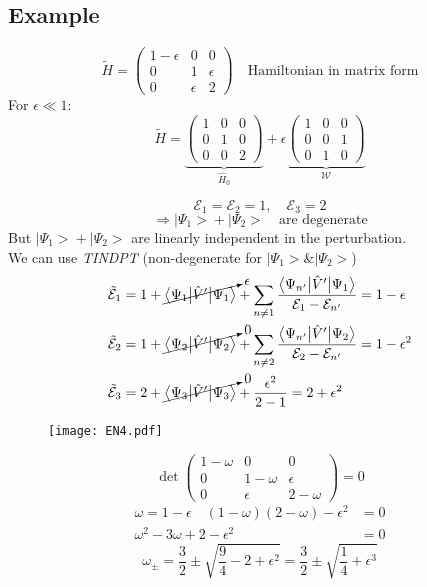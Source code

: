\documentclass[12pt,fancychapters]{report}
\numberwithin{equation}{section}
\begin{document}
\subsection*{Example}
\[
  \tilde{H} = 
  \begin{pmatrix}
  1-\epsilon & 0 & 0\\
  0 & 1 & \epsilon\\
  0 & \epsilon & 2
\end{pmatrix}\quad \text{Hamiltonian in matrix form}
\]
For $\epsilon \ll 1$:
\[
  \tilde{H} = 
  \underbrace{\begin{pmatrix}
  1 & 0 & 0\\
  0 & 1 & 0\\
  0 & 0 & 2
\end{pmatrix}}_{\hat{H}_0} + \epsilon 
  \underbrace{\begin{pmatrix}
  1 & 0 & 0\\
  0 & 0 & 1\\
  0 & 1 & 0
\end{pmatrix}}_{\mathcal{W}}
\]

\[
  \mathcal{E}_1 = \mathcal{E}_2 = 1, \quad \mathcal{E}_3 = 2
\]
\[
  \Rightarrow \big|\Psi_1\big> + \big|\Psi_2\big> \quad \text{are degenerate}
\]
But $ \big|\Psi_1\big> + \big|\Psi_2\big> $ are linearly independent in the perturbation.\\
We can use \emph{TINDPT} (non-degenerate for $\big|\Psi_1\big> \& \big|\Psi_2\big>$)
\begin{align*}
  \tilde{\mathcal{E}}_1 &= 1 + 
  \cancelto{\epsilon}{\big<\Psi_1\big|\hat{V}'\big|\Psi_1 \big>} + \sum_{n\neq 1}
  \frac{\big<\Psi_{n'}\big|\hat{V}'\big|\Psi_1 \big>}{\mathcal{E}_1 - 
  \mathcal{E}_{n'}} = 1-\epsilon\\
  \tilde{\mathcal{E}}_2 &= 1 + \cancelto{0}{\big<\Psi_2\big|\hat{V}'\big|\Psi_2 \big>} + \sum_{n\neq 2}
  \frac{\big<\Psi_{n'}\big|\hat{V}'\big|\Psi_2 \big>}{\mathcal{E}_2 - 
  \mathcal{E}_{n'}} = 1-\epsilon^2\\
  \tilde{\mathcal{E}}_3 &= 2 +\cancelto{0}{\big<\Psi_3\big|\hat{V}'\big|\Psi_3 \big>} +
  \frac{\epsilon^2}{2-1} = 2 + \epsilon^2
\end{align*}
\begin{figure}[H]
  \centering
	\texttt{[image: EN4.pdf]}
\end{figure}
\[
  \det 
  \begin{pmatrix}
  1-\omega & 0 & 0\\
  0 & 1-\omega & \epsilon\\
  0 & \epsilon & 2-\omega
\end{pmatrix}
 = 0 
\]
\begin{align*}
  \omega = 1 -\epsilon \quad (1 - \omega)(2-\omega) - \epsilon^2 &= 0\\
  \omega^2 - 3\omega + 2 - \epsilon^2 &= 0
\end{align*}
\[
  \boxed{\omega_\pm = \frac{3}{2} \pm \sqrt{\frac{9}{4}-2+\epsilon^2} = \frac{3}{2} \pm
  \sqrt{\frac{1}{4} + \epsilon^3}}
\]
\newpage
\end{document}
